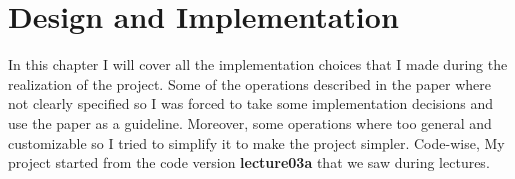 \section{Design and Implementation}
In this chapter I will cover all the implementation choices that I made during the realization of the project. Some of the operations described in the paper \cite{referencePaper} where not clearly specified so I was forced to take some implementation decisions and use the paper as a guideline. Moreover, some operations where too general and customizable so I tried to simplify it to make the project simpler. \newline
	Code-wise, My project started from the code version \textbf{lecture03a} that we saw during lectures.


